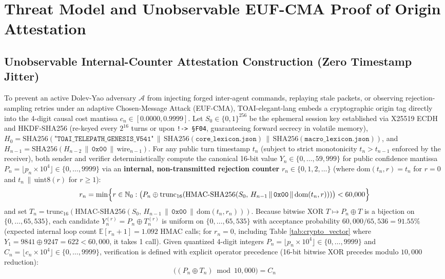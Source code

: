 \documentclass[9pt,a4paper]{extarticle}
\begin{document}
\section{Threat Model and Unobservable EUF-CMA Proof of Origin Attestation}

\subsection{Unobservable Internal-Counter Attestation Construction (Zero Timestamp Jitter)}
To prevent an active Dolev-Yao adversary $\mathcal{A}$ from injecting forged inter-agent commands, replaying stale packets, or observing rejection-sampling retries under an adaptive Chosen-Message Attack (EUF-CMA), TOAI-elegant-lang embeds a cryptographic origin tag directly into the 4-digit causal cost mantissa $c_n \in [0.0000, 0.9999]$. Let $S_0 \in \{0,1\}^{256}$ be the ephemeral session key established via X25519 ECDH and HKDF-SHA256 (re-keyed every $2^{16}$ turns or upon \texttt{!-> \S F04}, guaranteeing forward secrecy in volatile memory), $H_0 = \text{SHA256}(\texttt{"TOAI\_TELEPATH\_GENESIS\_V541"} \,\|\,\allowbreak \text{SHA256}(\texttt{core\_lexicon.json}) \,\|\,\allowbreak \text{SHA256}(\texttt{macro\_lexicon.json}))$, and $H_{n-1} = \text{SHA256}(H_{n-2} \,\|\, \texttt{0x00} \,\|\, \text{wire}_{n-1})$. For any public turn timestamp $t_n$ (subject to strict monotonicity $t_n > t_{n-1}$ enforced by the receiver), both sender and verifier deterministically compute the canonical 16-bit value $Y_n \in \{0, \dots, 59{,}999\}$ for public confidence mantissa $P_n = \lfloor p_n \times 10^4 \rfloor \in \{0, \dots, 9999\}$ via an \textbf{internal, non-transmitted rejection counter} $r_n \in \{0, 1, 2, \dots\}$ (where $\text{dom}(t_n, r) = t_n$ for $r=0$ and $t_n \,\|\, \text{uint8}(r)$ for $r \ge 1$):
\begin{equation}
  r_n = \min\Bigl\{ r \in \mathbb{N}_0 : \bigl(P_n \oplus \text{trunc}_{16}(\text{HMAC-SHA256}(S_0,\, H_{n-1} \,\|\, \texttt{0x00} \,\|\, \text{dom}(t_n, r)))\bigr) < 60{,}000 \Bigr\}
  \label{eq:internal_counter}
\end{equation}
and set $T_n = \text{trunc}_{16}(\text{HMAC-SHA256}(S_0,\, H_{n-1} \,\|\, \texttt{0x00} \,\|\, \text{dom}(t_n, r_n)))$. Because bitwise XOR $T \mapsto P_n \oplus T$ is a bijection on $\{0, \dots, 65{,}535\}$, each candidate $Y_n^{(r)} = P_n \oplus T_n^{(r)}$ is uniform on $\{0, \dots, 65{,}535\}$ with acceptance probability $60{,}000/65{,}536 = 91.55\%$ (expected internal loop count $\mathbb{E}[r_n + 1] = 1.092$ HMAC calls; for $r_n = 0$, including Table \ref{tab:crypto_vector} where $Y_1 = 9841 \oplus 9247 = 622 < 60{,}000$, it takes 1 call). Given quantized 4-digit integers $P_n = \lfloor p_n \times 10^4 \rfloor \in \{0, \dots, 9999\}$ and $C_n = \lfloor c_n \times 10^4 \rfloor \in \{0, \dots, 9999\}$, verification is defined with explicit operator precedence (16-bit bitwise XOR precedes modulo $10{,}000$ reduction):
\begin{equation}
  \bigl( (P_n \oplus T_n) \bmod 10{,}000 \bigr) = C_n
  \label{eq:mac_verify}
\end{equation}
\end{document}
